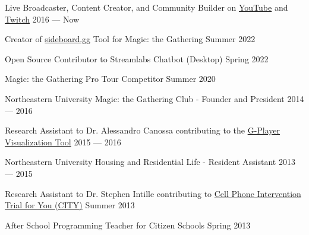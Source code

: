 Live Broadcaster, Content Creator, and Community Builder on \href{https://www.youtube.com/channel/UC6xvUC5NThwShk-wrhh01Mg}{YouTube} and \href{https://twitch.tv/ibroadband}{Twitch}   \hfill 2016 --- Now

Creator of \href{https://sideboard.gg}{sideboard.gg} Tool for Magic: the Gathering  \hfill Summer 2022

Open Source Contributor to Streamlabs Chatbot (Desktop) \hfill Spring 2022

Magic: the Gathering Pro Tour Competitor    \hfill Summer 2020

Northeastern University Magic: the Gathering Club - Founder and President   \hfill 2014 --- 2016

Research Assistant to Dr. Alessandro Canossa contributing to the \href{https://github.com/spacial-player-data-visualization/g-player-visualization}{G-Player Visualization Tool}   \hfill 2015 --- 2016

Northeastern University Housing and Residential Life - Resident Assistant   \hfill 2013 --- 2015

Research Assistant to Dr. Stephen Intille contributing to   \href{https://www.mhealthgroup.org/projects.html}{Cell Phone Intervention Trial for You (CITY)}   \hfill Summer 2013

After School Programming Teacher for Citizen Schools    \hfill Spring 2013

